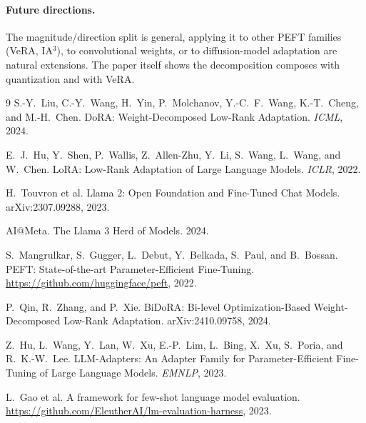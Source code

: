 \documentclass[11pt,twocolumn]{article}
\begin{document}
\paragraph{Future directions.} The magnitude/direction split is general,
applying it to other PEFT families (VeRA, IA$^3$), to convolutional
weights, or to diffusion-model adaptation are natural extensions. The
paper itself shows the decomposition composes with quantization
and with VeRA\cite{liu2024dora}.
\newpage
\begin{thebibliography}{9}
\footnotesize
{}
S.-Y.~Liu, C.-Y.~Wang, H.~Yin, P.~Molchanov, Y.-C.~F.~Wang, K.-T.~Cheng, and M.-H.~Chen.
DoRA: Weight-Decomposed Low-Rank Adaptation.
\emph{ICML}, 2024.

E.~J.~Hu, Y.~Shen, P.~Wallis, Z.~Allen-Zhu, Y.~Li, S.~Wang, L.~Wang, and W.~Chen.
LoRA: Low-Rank Adaptation of Large Language Models.
\emph{ICLR}, 2022.

H.~Touvron et al.
Llama 2: Open Foundation and Fine-Tuned Chat Models.
arXiv:2307.09288, 2023.

AI@Meta.
The Llama 3 Herd of Models. 2024.

S.~Mangrulkar, S.~Gugger, L.~Debut, Y.~Belkada, S.~Paul, and B.~Bossan.
PEFT: State-of-the-art Parameter-Efficient Fine-Tuning.
\url{https://github.com/huggingface/peft}, 2022.

P.~Qin, R.~Zhang, and P.~Xie.
BiDoRA: Bi-level Optimization-Based Weight-Decomposed Low-Rank Adaptation.
arXiv:2410.09758, 2024.

Z.~Hu, L.~Wang, Y.~Lan, W.~Xu, E.-P.~Lim, L.~Bing, X.~Xu, S.~Poria, and R.~K.-W.~Lee.
LLM-Adapters: An Adapter Family for Parameter-Efficient Fine-Tuning of Large Language Models.
\emph{EMNLP}, 2023.

L.~Gao et al.
A framework for few-shot language model evaluation.
\url{https://github.com/EleutherAI/lm-evaluation-harness}, 2023.

\end{thebibliography}
\end{document}
